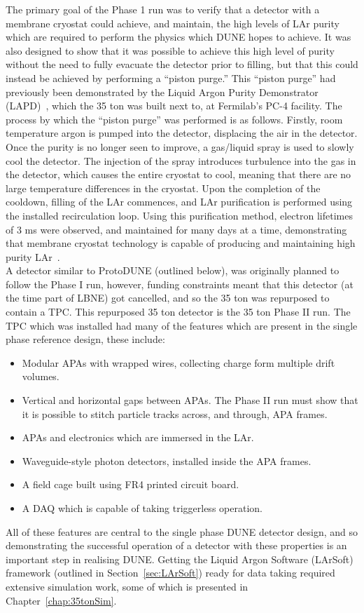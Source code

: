 The primary goal of the Phase 1 run was to verify that a detector with a membrane cryostat could achieve, and maintain, the high levels of LAr purity which are required to perform the physics which DUNE hopes to achieve. It was also designed to show that it was possible to achieve this high level of purity without the need to fully evacuate the detector prior to filling, but that this could instead be achieved by performing a ``piston purge.'' This ``piston purge'' had previously been demonstrated by the Liquid Argon Purity Demonstrator (LAPD)~\citep{LAPD}, which the 35 ton was built next to, at Fermilab's PC-4 facility. The process by which the ``piston purge'' was performed is as follows. Firstly, room temperature argon is pumped into the detector, displacing the air in the detector. Once the purity is no longer seen to improve, a gas/liquid spray is used to slowly cool the detector. The injection of the spray introduces turbulence into the gas in the detector, which causes the entire cryostat to cool, meaning that there are no large temperature differences in the cryostat. Upon the completion of the cooldown, filling of the LAr commences, and LAr purification is performed using the installed recirculation loop. Using this purification method, electron lifetimes of 3 ms were observed, and maintained for many days at a time, demonstrating that membrane cryostat technology is capable of producing and maintaining high purity LAr~\citep{35tonMontanari, 35tonHahn}. \\

A detector similar to ProtoDUNE (outlined below), was originally planned to follow the Phase I run, however, funding constraints meant that this detector (at the time part of LBNE) got cancelled, and so the 35 ton was repurposed to contain a TPC. This repurposed 35 ton detector is the 35 ton Phase II run. The TPC which was installed had many of the features which are present in the single phase reference design, these include:
\begin{itemize}
\item Modular APAs with wrapped wires, collecting charge form multiple drift volumes.
\item Vertical and horizontal gaps between APAs. The Phase II run must show that it is possible to stitch particle tracks across, and through, APA frames.
\item APAs and electronics which are immersed in the LAr.
\item Waveguide-style photon detectors, installed inside the APA frames.
\item A field cage built using FR4 printed circuit board.
\item A DAQ which is capable of taking triggerless operation.
\end{itemize}
All of these features are central to the single phase DUNE detector design, and so demonstrating the successful operation of a detector with these properties is an important step in realising DUNE. Getting the Liquid Argon Software (LArSoft) framework (outlined in Section~\ref{sec:LArSoft}) ready for data taking required extensive simulation work, some of which is presented in Chapter~\ref{chap:35tonSim}. \\


